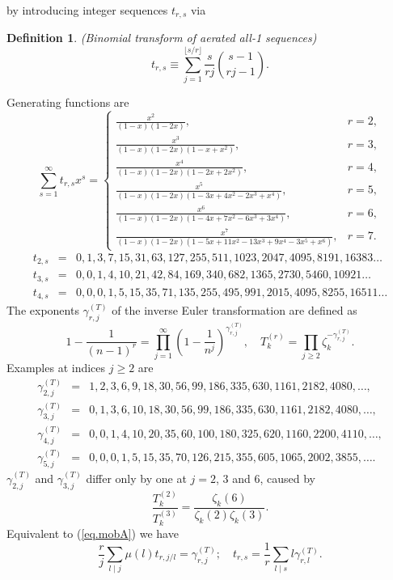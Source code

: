 \documentclass{amsart}
\newtheorem{defn}{Definition}
\begin{document}
by introducing integer sequences $t_{r,s}$ via
\begin{defn}
(Binomial transform of aerated all-1 sequences)
\begin{equation}
t_{r,s}\equiv
\sum_{j=1} ^{\lfloor s/r\rfloor}\frac{s}{rj}
 \binom{s-1}{rj-1}
.
\end{equation}
\end{defn}
Generating functions are
\begin{equation}
\sum_{s=1}^\infty t_{r,s} x^s = 
\left\{
\begin{array}{ll}
\frac{x^2}{(1-x)(1-2x)},& r=2,\\
\frac{x^3}{(1-x)(1-2x)(1-x+x^2)},& r=3, \\
\frac{x^4}{(1-x)(1-2x)(1-2x+2x^2)},& r=4, \\
\frac{x^5}{(1-x)(1-2x)(1-3x+4x^2-2x^3+x^4)},& r=5,\\
\frac{x^6}{(1-x)(1-2x)(1-4x+7x^2-6x^3+3x^4)},& r=6,\\
\frac{x^7}{(1-x)(1-2x)(1-5x+11x^2-13x^3+9x^4-3x^5+x^6)},& r=7.
\end{array}
\right.
\end{equation}
\begin{eqnarray}
t_{2,s}&=& 0,1,3,7,15,31,63,127,255,511,1023,2047,4095,8191,16383
\ldots
\\
t_{3,s}&=& 0,0,1,4,10,21,42,84,169,340,682,1365,2730,5460,10921
\ldots
\\
t_{4,s}&=& 0,0,0,1,5,15,35,71,135,255,495,991,2015,4095,8255,16511
\ldots
\end{eqnarray}
The exponents $\gamma_{r,j}^{(T)}$ of the
inverse Euler transformation are defined as
\begin{equation}
1-\frac{1}{(n-1)^r} = \prod_{j=1}^\infty \left(1-\frac{1}{n^j}\right)^{\gamma_{r,j}^{(T)}}
,
\quad
T_k^{(r)} = \prod_{j\ge 2} \zeta_k^{-\gamma_{r,j}^{(T)}}.
\end{equation}
Examples at indices $j\ge 2$ are
\begin{eqnarray}
\gamma_{2,j}^{(T)} &=& 1, 2, 3, 6, 9, 18, 30, 56, 99, 186, 335, 630, 1161, 2182, 4080,
\ldots ,
\\
\gamma_{3,j}^{(T)} &=& 0, 1, 3, 6, 10, 18, 30, 56, 99, 186, 335, 630, 1161, 2182, 4080,
\ldots ,
\\
\gamma_{4,j}^{(T)} &=& 0, 0, 1, 4, 10, 20, 35, 60, 100, 180, 325, 620, 1160, 2200, 4110,
\ldots ,
\\
\gamma_{5,j}^{(T)} &=& 0, 0, 0, 1, 5, 15, 35, 70, 126, 215, 355, 605, 1065, 2002, 3855,
\ldots .
\end{eqnarray}
$\gamma_{2,j}^{(T)}$ and $\gamma_{3,j}^{(T)}$ differ only
by one at $j=2$, $3$ and $6$, caused by
\begin{equation}
\frac{ T_k^{(2)} }{ T_k^{(3)}}
=
\frac{ \zeta_k(6)}{ \zeta_k(2)\zeta_k(3)}.
\end{equation}
Equivalent to (\ref{eq.mobA}) we have
\begin{equation}
\frac{r}{j}\sum_{l\mid j}\mu(l) t_{r,j/l} = \gamma_{r,j}^{(T)};\quad
t_{r,s} = \frac{1}{r}\sum_{l\mid s}l \gamma_{r,l}^{(T)}.
\end{equation}
\end{document}
